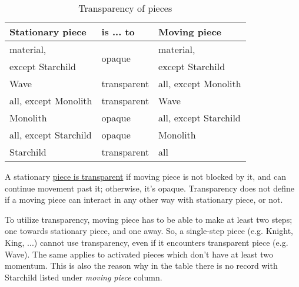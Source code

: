 \begin{table}[!h]
\centering
\begin{tabular}{ lll }
\toprule %
\textbf{Stationary piece}           & \textbf{is ... to}            & \textbf{Moving piece}         \\
\midrule %
material\footnotemark[1],           & \multirow{2}{*}{opaque}       & material\footnotemark[1],     \\
except Starchild                    &                               & except Starchild              \\
\cmidrule{1-3} %
Wave                                & transparent                   & all, except Monolith          \\
all, except Monolith                & transparent                   & Wave                          \\
Monolith                            & opaque                        & all, except Starchild         \\
all, except Starchild               & opaque                        & Monolith                      \\
Starchild                           & transparent                   & all                           \\
\bottomrule %
\end{tabular}
\caption{Transparency of pieces}
\label{tbl:Appendix/Summary/Transparency of pieces}
\end{table}


A stationary \hyperref[fig:scn_mv_07_wave_is_transparent]{piece is transparent}
if moving piece is not blocked by it, and can continue movement past it; otherwise,
it's opaque. Transparency does not define if a moving piece can interact in any
other way with stationary piece, or not.

To utilize transparency, moving piece has to be able to make at least two steps;
one towards stationary piece, and one away. So, a single-step piece (e.g. Knight,
King, ...) cannot use transparency, even if it encounters transparent piece (e.g.
Wave). The same applies to activated pieces which don't have at least two momentum.
This is also the reason why in the table there is no record with Starchild listed
under \emph{moving piece} column.

